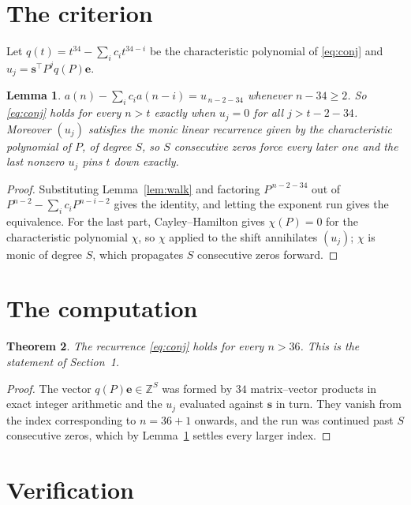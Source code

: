 \documentclass[11pt,a4paper]{article}
\theoremstyle{plain}
\newtheorem{theorem}{Theorem}
\newtheorem{lemma}[theorem]{Lemma}
\theoremstyle{definition}
\begin{document}
\section{The criterion}

Let $q(t)=t^{34}-\sum_i c_i t^{34-i}$ be the characteristic polynomial of
\eqref{eq:conj} and $u_j=\mathbf{s}^{\!\top}P^{j}q(P)\mathbf{e}$.

\begin{lemma}\label{lem:crit}
$a(n)-\sum_i c_i a(n-i)=u_{\,n-2-34}$ whenever $n-34\ge2$. So \eqref{eq:conj}
holds for every $n>t$ exactly when $u_j=0$ for all $j>t-2-34$. Moreover $(u_j)$
satisfies the monic linear recurrence given by the characteristic polynomial of $P$, of
degree $S$, so $S$ consecutive zeros force every later one and the last nonzero $u_j$ pins
$t$ down exactly.
\end{lemma}

\begin{proof}
Substituting Lemma~\ref{lem:walk} and factoring $P^{\,n-2-34}$ out of
$P^{n-2}-\sum_i c_i P^{n-i-2}$ gives the identity, and letting the exponent run gives the
equivalence. For the last part, Cayley--Hamilton gives $\chi(P)=0$ for the characteristic
polynomial $\chi$, so $\chi$ applied to the shift annihilates $(u_j)$; $\chi$ is monic of
degree $S$, which propagates $S$ consecutive zeros forward.
\end{proof}

\section{The computation}

\begin{theorem}
The recurrence \eqref{eq:conj} holds for every $n>36$. This is the statement of
Section~1.
\end{theorem}

\begin{proof}
The vector $q(P)\mathbf{e}\in\mathbb{Z}^{S}$ was formed by $34$ matrix--vector
products in exact integer arithmetic and the $u_j$ evaluated against $\mathbf{s}$ in turn.
They vanish from the index corresponding to $n=36+1$ onwards, and the run was continued
past $S$ consecutive zeros, which by Lemma~\ref{lem:crit} settles every larger index.
\end{proof}

\section{Verification}
\end{document}

